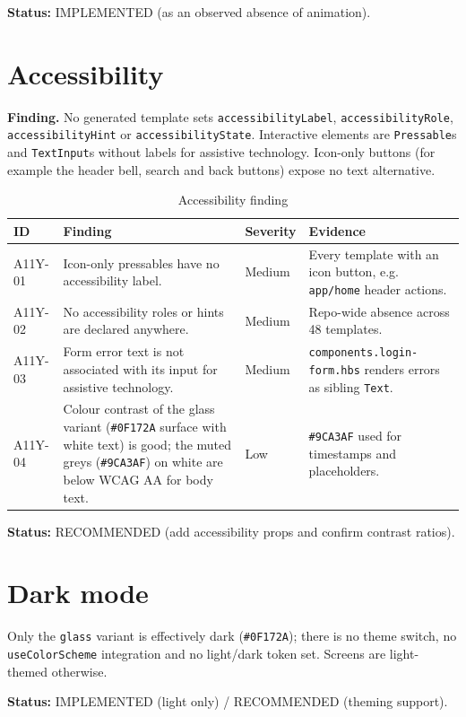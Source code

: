 \textbf{Status:} IMPLEMENTED (as an observed absence of animation).

\section{Accessibility}

\textbf{Finding.} No generated template sets
\texttt{accessibilityLabel}, \texttt{accessibilityRole},
\texttt{accessibilityHint} or \texttt{accessibilityState}. Interactive elements are
\texttt{Pressable}s and \texttt{TextInput}s without labels for assistive
technology. Icon-only buttons (for example the header bell, search and back
buttons) expose no text alternative.

\begin{longtable}{p{1.4cm}p{4.4cm}p{3cm}p{5.4cm}}
\caption{Accessibility finding}\\
\toprule
\textbf{ID} & \textbf{Finding} & \textbf{Severity} & \textbf{Evidence} \\
\midrule

A11Y-01 & Icon-only pressables have no accessibility label. & Medium & Every template with an icon button, e.g. \texttt{app/home} header actions. \\
A11Y-02 & No accessibility roles or hints are declared anywhere. & Medium & Repo-wide absence across 48 templates. \\
A11Y-03 & Form error text is not associated with its input for assistive technology. & Medium & \texttt{components.login-form.hbs} renders errors as sibling \texttt{Text}. \\
A11Y-04 & Colour contrast of the glass variant (\texttt{\#0F172A} surface with white text) is good; the muted greys (\texttt{\#9CA3AF}) on white are below WCAG AA for body text. & Low & \texttt{\#9CA3AF} used for timestamps and placeholders. \\
\bottomrule
\end{longtable}

\textbf{Status:} RECOMMENDED (add accessibility props and confirm contrast ratios).

\section{Dark mode}

Only the \texttt{glass} variant is effectively dark
(\texttt{\#0F172A}); there is no theme switch, no \texttt{useColorScheme}
integration and no light/dark token set. Screens are light-themed otherwise.

\textbf{Status:} IMPLEMENTED (light only) / RECOMMENDED (theming support).

